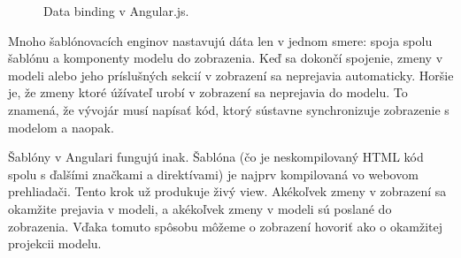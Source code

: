 \begin{figure}[H]
\caption{Data binding v Angular.js.}
\end{figure}

Mnoho šablónovacích enginov nastavujú dáta len v jednom smere: spoja spolu šablónu a komponenty modelu do zobrazenia. Keď sa dokončí spojenie, zmeny v modeli alebo jeho príslušných sekcií v zobrazení sa neprejavia automaticky. Horšie je, že zmeny ktoré úžívateľ urobí v zobrazení sa neprejavia do modelu. To znamená, že vývojár musí napísať kód, ktorý sústavne synchronizuje zobrazenie s modelom a naopak.

Šablóny v Angulari fungujú inak. Šablóna (čo je neskompilovaný HTML kód spolu s ďalšími značkami a direktívami) je najprv kompilovaná vo webovom prehliadači. Tento krok už produkuje živý view. Akékoľvek zmeny v zobrazení sa okamžite prejavia v modeli, a akékoľvek zmeny v modeli sú poslané do zobrazenia. Vďaka tomuto spôsobu môžeme o zobrazení hovoriť ako o okamžitej projekcii modelu.

